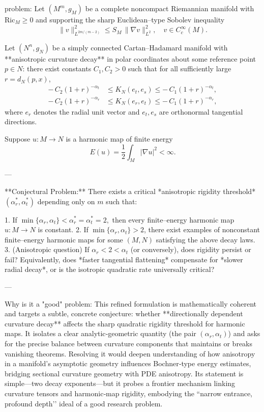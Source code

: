 problem:  
Let \((M^m,g_M)\) be a complete noncompact Riemannian manifold with \(\mathrm{Ric}_M\ge0\) and supporting the sharp Euclidean–type Sobolev inequality  
\[
\|v\|_{L^{2m/(m-2)}}^2 \le S_M\,\|\nabla v\|_{L^2}^2, \quad v\in C_c^\infty(M).
\]

Let \((N^n,g_N)\) be a simply connected Cartan–Hadamard manifold with **anisotropic curvature decay** in polar coordinates about some reference point \(p\in N\): there exist constants \(C_1,C_2>0\) such that for all sufficiently large \(r=d_N(p,x)\),
\[
\begin{aligned}
-\,C_2(1+r)^{-\alpha_t} &\le K_N(e_t,e_s) \le -\,C_1(1+r)^{-\alpha_t},\\
-\,C_2(1+r)^{-\alpha_r} &\le K_N(e_r,e_t) \le -\,C_1(1+r)^{-\alpha_r},
\end{aligned}
\]
where \(e_r\) denotes the radial unit vector and \(e_t,e_s\) are orthonormal tangential directions.

Suppose \(u:M\to N\) is a harmonic map of finite energy
\[
E(u) = \frac{1}{2}\int_M |\nabla u|^2 < \infty.
\]

---

**Conjectural Problem:**  
There exists a critical *anisotropic rigidity threshold* \((\alpha_r^*,\alpha_t^*)\) depending only on \(m\) such that:

1. If \(\min\{\alpha_r,\alpha_t\} < \alpha_r^*=\alpha_t^* = 2,\) then every finite–energy harmonic map \(u:M\to N\) is constant.  
2. If \(\min\{\alpha_r,\alpha_t\} > 2\), there exist examples of nonconstant finite–energy harmonic maps for some \((M,N)\) satisfying the above decay laws.  
3. (Anisotropic question) If \(\alpha_r < 2 < \alpha_t\) (or conversely), does rigidity persist or fail?  Equivalently, does *faster tangential flattening* compensate for *slower radial decay*, or is the isotropic quadratic rate universally critical?

---

Why is it a "good" problem:  
This refined formulation is mathematically coherent and targets a subtle, concrete conjecture: whether **directionally dependent curvature decay** affects the sharp quadratic rigidity threshold for harmonic maps. It isolates a clear analytic‑geometric quantity (the pair \((\alpha_r,\alpha_t)\)) and asks for the precise balance between curvature components that maintains or breaks vanishing theorems.  
Resolving it would deepen understanding of how anisotropy in a manifold’s asymptotic geometry influences Bochner‑type energy estimates, bridging sectional curvature geometry with PDE anisotropy. Its statement is simple—two decay exponents—but it probes a frontier mechanism linking curvature tensors and harmonic‑map rigidity, embodying the “narrow entrance, profound depth’’ ideal of a good research problem.